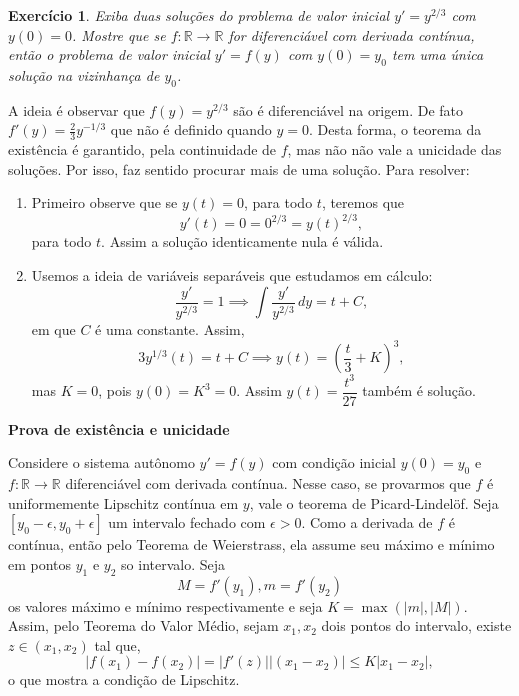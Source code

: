 \documentclass[a4paper,12pt]{article}
\newcommand{\R}{\mathbb{R}}
\theoremstyle{exer}
\newtheorem{exercise}{Exercício}
\theoremstyle{definition}
\begin{document}
\begin{exercise}
    Exiba duas soluções do problema de valor inicial $y'=y^{2/3}$ com $y(0) =
    0$. Mostre que se $f:\R \to \R$ for diferenciável com derivada contínua,
    então o problema de valor inicial $y' = f(y)$ com $y(0) = y_0$ tem uma única solução na vizinhança de $y_0$.
\end{exercise}

A ideia é observar que $f(y) = y^{2/3}$ são é diferenciável na origem. De fato
$f'(y) = \frac{2}{3}y^{-1/3}$ que não é definido quando $y = 0$. Desta forma,
o teorema da existência é garantido, pela continuidade de $f$, mas não não
vale a unicidade das soluções. Por isso, faz sentido procurar mais de uma
solução. Para resolver:

\begin{enumerate}
    \item Primeiro observe que se $y(t) = 0$, para todo $t$, teremos que 
    $$
    y'(t) = 0 = 0^{2/3} = y(t)^{2/3}, 
    $$
    para todo $t$. Assim a solução identicamente nula é válida.
    
    \item Usemos a ideia de variáveis separáveis que estudamos em cálculo: 
    $$
    \frac{y'}{y^{2/3}} = 1 \implies \int \frac{y'}{y^{2/3}}\, dy  = t + C, 
    $$
    em que $C$ é uma constante. Assim, 
    $$
    3y^{1/3}(t) = t + C \implies y(t) = \left(\frac{t}{3} + K\right)^3, 
    $$
    mas $K = 0$, pois $y(0) = K^3 = 0$. Assim $y(t) = \dfrac{t^3}{27}$ também é
   solução. 
    
\end{enumerate}

{\bf Prova de existência e unicidade}

Considere o sistema autônomo $y' = f(y)$ com condição inicial $y(0) = y_0$ e
$f : \R \to \R$ diferenciável com derivada contínua. Nesse caso, se provarmos
que $f$ é
uniformemente Lipschitz contínua em $y$, vale o teorema de Picard-Lindelöf.
Seja $[y_0-\epsilon, y_0 + \epsilon]$ um intervalo fechado com $\epsilon > 0$. Como a
derivada de $f$ é contínua, então pelo Teorema de Weierstrass, ela assume seu
máximo e mínimo em pontos $y_1$ e $y_2$ so intervalo. Seja 
$$
M = f'(y_1), m = f'(y_2)
$$
os valores máximo e mínimo respectivamente e seja $K = \max(|m|, |M|)$. Assim,
pelo Teorema do Valor Médio, sejam $x_1, x_2$ dois pontos do intervalo, existe
$z \in (x_1, x_2)$ tal que, 
$$
|f(x_1) - f(x_2)| = |f'(z)||(x_1 - x_2)| \le K|x_1 - x_2|,  
$$
o que mostra a condição de Lipschitz. 
\end{document}
